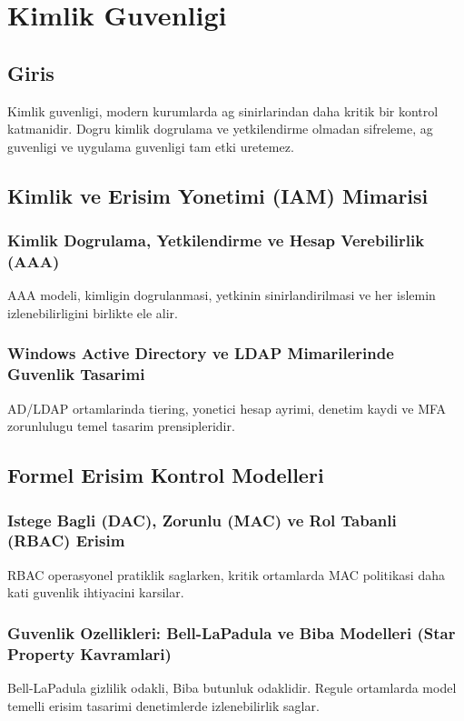 ﻿\chapter{Kimlik Guvenligi}

\section*{Giris}
Kimlik guvenligi, modern kurumlarda ag sinirlarindan daha kritik bir kontrol katmanidir. Dogru kimlik dogrulama ve yetkilendirme olmadan sifreleme, ag guvenligi ve uygulama guvenligi tam etki uretemez.

\section{Kimlik ve Erisim Yonetimi (IAM) Mimarisi}
\subsection{Kimlik Dogrulama, Yetkilendirme ve Hesap Verebilirlik (AAA)}
AAA modeli, kimligin dogrulanmasi, yetkinin sinirlandirilmasi ve her islemin izlenebilirligini birlikte ele alir.

\subsection{Windows Active Directory ve LDAP Mimarilerinde Guvenlik Tasarimi}
AD/LDAP ortamlarinda tiering, yonetici hesap ayrimi, denetim kaydi ve MFA zorunlulugu temel tasarim prensipleridir.

\section{Formel Erisim Kontrol Modelleri}
\subsection{Istege Bagli (DAC), Zorunlu (MAC) ve Rol Tabanli (RBAC) Erisim}
RBAC operasyonel pratiklik saglarken, kritik ortamlarda MAC politikasi daha kati guvenlik ihtiyacini karsilar.

\subsection{Guvenlik Ozellikleri: Bell-LaPadula ve Biba Modelleri (Star Property Kavramlari)}
Bell-LaPadula gizlilik odakli, Biba butunluk odaklidir. Regule ortamlarda model temelli erisim tasarimi denetimlerde izlenebilirlik saglar.

